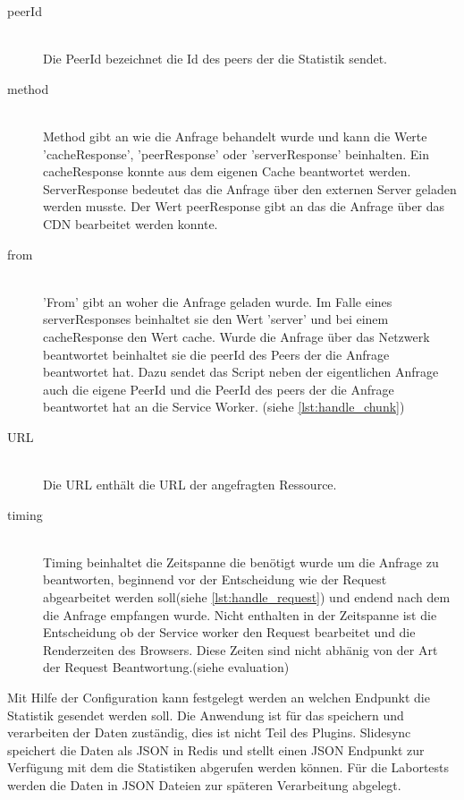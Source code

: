 \begin{description}
\item[peerId]\hfill \\
Die PeerId bezeichnet die Id des peers der die Statistik sendet.
\item[method]\hfill \\
Method gibt an wie die Anfrage behandelt wurde und kann die Werte 'cacheResponse', 'peerResponse' oder 'serverResponse' beinhalten. Ein cacheResponse konnte aus dem eigenen Cache beantwortet werden. ServerResponse bedeutet das die Anfrage über den externen Server geladen werden musste. Der Wert peerResponse gibt an das die Anfrage über das \pTp CDN bearbeitet werden konnte.
\item[from]\hfill \\
 'From' gibt an woher die Anfrage geladen wurde. Im Falle eines serverResponses beinhaltet sie den Wert 'server' und bei einem cacheResponse den Wert cache. Wurde die Anfrage über das \pTp Netzwerk beantwortet beinhaltet sie die peerId des Peers der die Anfrage beantwortet hat. Dazu sendet das Script neben der eigentlichen Anfrage auch die eigene PeerId und die PeerId des peers der die Anfrage beantwortet hat an die Service Worker. (siehe \ref{lst:handle_chunk}) 
\item[URL]\hfill \\
Die URL enthält die URL der angefragten Ressource. 
\item[timing]\hfill \\
Timing beinhaltet die Zeitspanne die benötigt wurde um die Anfrage zu beantworten, beginnend vor der Entscheidung wie der Request abgearbeitet werden soll(siehe \ref{lst:handle_request}) und endend nach dem die Anfrage empfangen wurde. Nicht enthalten in der Zeitspanne ist die Entscheidung ob der Service worker den Request bearbeitet und die Renderzeiten des Browsers. Diese Zeiten sind nicht abhänig von der Art der Request Beantwortung.(siehe evaluation)
\end{description}
Mit Hilfe der Configuration kann festgelegt werden an welchen Endpunkt die Statistik gesendet werden soll. Die Anwendung ist für das speichern und verarbeiten der Daten zuständig, dies ist nicht Teil des Plugins. Slidesync speichert die Daten als JSON in Redis und stellt einen JSON Endpunkt zur Verfügung mit dem die Statistiken abgerufen werden können. Für die Labortests werden die Daten in JSON Dateien zur späteren Verarbeitung abgelegt.
\begin{listing}[h]
	\inputminted{javascript}{listings/_handle_chunk.js}
	\caption{}
	\label{lst:handle_chunk}
\end{listing}

